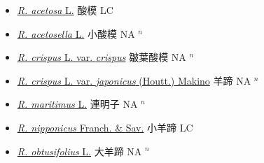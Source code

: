 \begin{itemize}
  \begin{itemize}
        \item[] \href{http://www.theplantlist.org/tpl1.1/search?q=Rumex+acetosa}{\textit{R. acetosa} L.}   酸模 LC
        \item[] \href{http://www.theplantlist.org/tpl1.1/search?q=Rumex+acetosella}{\textit{R. acetosella} L.}   小酸模 NA $^n$
        \item[] \href{http://www.theplantlist.org/tpl1.1/search?q=Rumex+crispus+var.+crispus}{\textit{R. crispus} L. var. \textit{crispus}}   皺葉酸模 NA $^n$
        \item[] \href{http://www.theplantlist.org/tpl1.1/search?q=Rumex+crispus+var.+japonicus}{\textit{R. crispus} L. var. \textit{japonicus} (Houtt.) Makino}   羊蹄 NA $^n$
        \item[] \href{http://www.theplantlist.org/tpl1.1/search?q=Rumex+maritimus}{\textit{R. maritimus} L.}   連明子 NA $^n$
        \item[] \href{http://www.theplantlist.org/tpl1.1/search?q=Rumex+nipponicus}{\textit{R. nipponicus} Franch. \& Sav.}   小羊蹄 LC
        \item[] \href{http://www.theplantlist.org/tpl1.1/search?q=Rumex+obtusifolius}{\textit{R. obtusifolius} L.}   大羊蹄 NA $^n$
  \end{itemize}
  \end{itemize}
